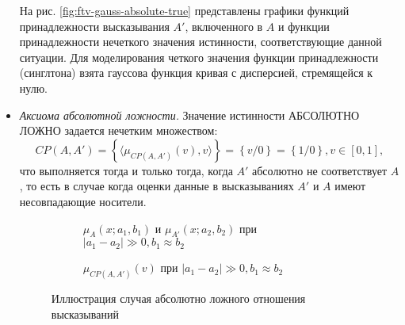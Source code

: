 \begin{itemize}
На рис. \ref{fig:ftv-gauss-absolute-true} представлены графики функций принадлежности высказывания $A'$, включенного в $A$ и функции принадлежности нечеткого значения истинности, соответствующие данной ситуации. Для моделирования четкого значения функции принадлежности (синглтона) взята гауссова функция кривая с дисперсией, стремящейся к нулю.

\item \textit{Аксиома абсолютной ложности.}  Значение истинности АБСОЛЮТНО ЛОЖНО задается нечетким множеством:
\begin{equation*}
CP(A, A') = \left\{\langle\mu_{CP(A, A')}(v), v\rangle\right\} = \left\{v/0\right\} = \left\{1/0\right\}, v \in [0, 1],
\end{equation*}
что выполняется тогда и только тогда, когда $A'$ абсолютно не соответствует $A$, то есть в случае когда оценки данные в высказываниях $A'$ и $A$ имеют несовпадающие носители.

\begin{figure}[ht]
	\newcommand{\aOne}{0.3}
	\newcommand{\bOne}{0.05}
	\newcommand{\aTwo}{0.67}
	\newcommand{\bTwo}{0.05}
	\begin{subfigure}[t]{0.5\textwidth}
		\caption{$\mu_A(x; a_1, b_1)$ и $\mu_{A'}(x; a_2, b_2)$ при $|a_1 - a_2| \gg 0, b_1 \approx b_2$}
	\end{subfigure}
	\begin{subfigure}[t]{0.5\textwidth}
		\caption{$\mu_{CP(A,A')}(v)$ при $|a_1 - a_2| \gg 0, b_1 \approx b_2$}
	\end{subfigure}
	\caption{Иллюстрация случая абсолютно ложного отношения высказываний}
	\label{fig:ftv-gauss-absolute-false}
\end{figure}


\end{itemize}
